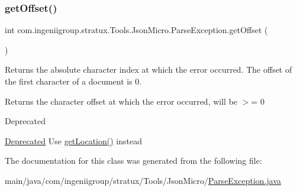 \subsubsection{\texorpdfstring{get\+Offset()}{getOffset()}}
{\footnotesize\ttfamily int com.\+ingeniigroup.\+stratux.\+Tools.\+Json\+Micro.\+Parse\+Exception.\+get\+Offset (\begin{DoxyParamCaption}{ }\end{DoxyParamCaption})}

Returns the absolute character index at which the error occurred. The offset of the first character of a document is 0.

\begin{DoxyReturn}{Returns}
the character offset at which the error occurred, will be $>$= 0 
\end{DoxyReturn}
\begin{DoxyRefDesc}{Deprecated}
\item[\hyperlink{deprecated__deprecated000016}{Deprecated}]Use \hyperlink{classcom_1_1ingeniigroup_1_1stratux_1_1_tools_1_1_json_micro_1_1_parse_exception_afdae6799272dd08bfff13f37bc91396a}{get\+Location()} instead \end{DoxyRefDesc}


The documentation for this class was generated from the following file\+:\begin{DoxyCompactItemize}
\item 
main/java/com/ingeniigroup/stratux/\+Tools/\+Json\+Micro/\hyperlink{_parse_exception_8java}{Parse\+Exception.\+java}\end{DoxyCompactItemize}
